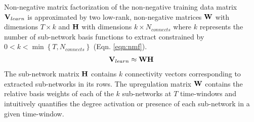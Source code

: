 Non-negative matrix factorization \cite{lee1999learning} of the non-negative training data matrix $\mathbf{\displaystyle V}_{learn}$ is approximated by two low-rank, non-negative matrices $\mathbf{\displaystyle W}$ with dimensions $T \times k$ and $\mathbf{\displaystyle H}$ with dimensions $k \times N_{connects}$ where $k$ represents the number of sub-network basis functions to extract constrained by $0<k<\min\left\{T, N_{connects}\right\}$ (Eqn. \ref{eqn:nmf}).
\begin{eqnarray}
    \label{eqn:nmf}
    \mathbf{\displaystyle V}_{learn} \approx \mathbf{\displaystyle W}\mathbf{\displaystyle H}
\end{eqnarray}
The sub-network matrix $\mathbf{\displaystyle H}$ contains $k$ connectivity vectors corresponding to extracted sub-networks in its rows. The upregulation matrix $\mathbf{\displaystyle W}$ contains the relative basis weights of each of the $k$ sub-networks at $T$ time-windows and intuitively quantifies the degree activation or presence of each sub-network in a given time-window. 

